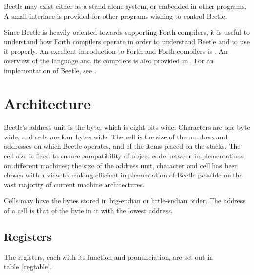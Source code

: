 \documentclass{article}
\newlength{\pronunc}\pronunc=1.7in
\begin{document}
Beetle may exist either as a stand-alone system, or embedded in other programs.
A small interface is provided for other programs wishing to control Beetle.

Since Beetle is heavily oriented towards supporting Forth compilers, it is
useful to understand how Forth compilers operate in order to understand Beetle
and to use it properly. An excellent introduction to Forth and Forth compilers
is \cite{starting4th}. An overview of the language and its compilers is also
provided in \cite{ANSIforth}. For an implementation of Beetle, see \cite{cbeetle}.


\section{Architecture}

Beetle's address unit is the byte, which is eight bits wide. Characters are one
byte wide, and cells are four bytes wide. The cell is the size of the numbers
and addresses on which Beetle operates, and of the items placed on the stacks.
The cell size is fixed to ensure compatibility of object code between
implementations on different machines; the size of the address unit, character
and cell has been chosen with a view to making efficient implementation of
Beetle possible on the vast majority of current machine architectures.

Cells may have the bytes stored in big-endian or little-endian order. The
address of a cell is that of the byte in it with the lowest address.


\subsection{Registers}
\label{registers}

The registers, each with its function and pronunciation, are set out in table~\ref{regtable}.
\end{document}
